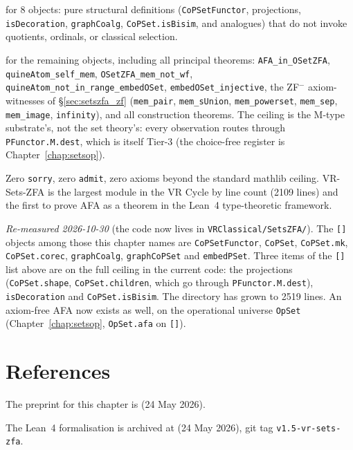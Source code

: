 \axiomprofile{[]} for 8 objects: pure structural definitions
(\texttt{CoPSetFunctor}, projections, \texttt{isDecoration},
\texttt{graphCoalg}, \texttt{CoPSet.isBisim}, and analogues) that do not
invoke quotients, ordinals, or classical selection.

 for the remaining objects,
including all principal theorems: \texttt{AFA\_in\_OSetZFA},
\texttt{quineAtom\_self\_mem}, \texttt{OSetZFA\_mem\_not\_wf},
\texttt{quineAtom\_not\_in\_range\_embedOSet},
\texttt{embedOSet\_injective}, the ZF$^-$ axiom-witnesses of
\S\ref{sec:setszfa_zf} (\texttt{mem\_pair}, \texttt{mem\_sUnion},
\texttt{mem\_powerset}, \texttt{mem\_sep}, \texttt{mem\_image},
\texttt{infinity}), and all construction theorems.  The ceiling is the M-type
substrate's, not the set theory's: every observation routes through
\texttt{PFunctor.M.dest}, which is itself Tier-3 (the choice-free register is
Chapter~\ref{chap:setsop}).

Zero \texttt{sorry}, zero \texttt{admit}, zero axioms beyond the standard
mathlib ceiling.  VR-Sets-ZFA is the largest module in the VR Cycle
by line count (2109 lines) and the first to prove AFA as a theorem in
the Lean~4 type-theoretic framework.

\emph{Re-measured 2026-10-30} (the code now lives in \texttt{VRClassical/SetsZFA/}).
The \texttt{[]} objects among those this chapter names are \texttt{CoPSetFunctor},
\texttt{CoPSet}, \texttt{CoPSet.mk}, \texttt{CoPSet.corec}, \texttt{graphCoalg},
\texttt{graphCoPSet} and \texttt{embedPSet}.  Three items of the \texttt{[]} list above are
on the full ceiling in the current code: the projections (\texttt{CoPSet.shape},
\texttt{CoPSet.children}, which go through \texttt{PFunctor.M.dest}),
\texttt{isDecoration} and \texttt{CoPSet.isBisim}.  The directory has grown to 2519
lines.  An axiom-free AFA now exists as well, on the operational universe
\texttt{OpSet} (Chapter~\ref{chap:setsop}, \texttt{OpSet.afa} on \texttt{[]}).

\section{References}
\label{sec:setszfa_refs}

The preprint for this chapter is
 (24 May 2026).

The Lean~4 formalisation is archived at
 (24 May 2026),
git tag \texttt{v1.5-vr-sets-zfa}.
